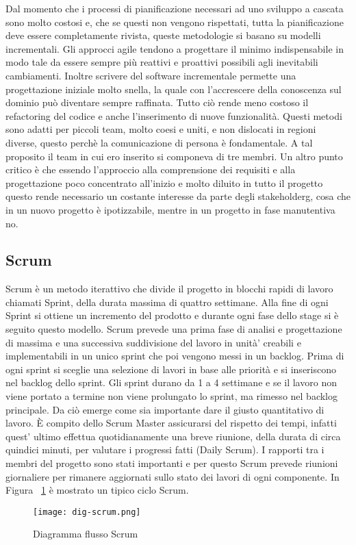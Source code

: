 Dal momento che i processi di pianificazione necessari ad uno sviluppo a cascata sono molto costosi e, che se questi non vengono rispettati, tutta la pianificazione deve essere completamente rivista, queste metodologie si basano su modelli incrementali. Gli approcci agile tendono a progettare il minimo indispensabile in modo tale da essere sempre più reattivi e proattivi possibili agli inevitabili cambiamenti. Inoltre scrivere del software incrementale permette una progettazione iniziale molto snella, la quale con l’accrescere della conoscenza sul dominio può diventare sempre raffinata. Tutto ciò rende meno costoso il refactoring del codice e anche l’inserimento di nuove funzionalità. 
Questi metodi sono adatti per piccoli team, molto coesi e uniti, e non dislocati in regioni diverse, questo perchè la comunicazione di persona è fondamentale. A tal proposito il team in cui ero inserito si componeva di tre membri.
Un altro punto critico è che essendo l’approccio alla comprensione dei requisiti e alla progettazione poco concentrato all’inizio e molto diluito in tutto il progetto questo rende necessario un costante interesse da parte degli \gls{stakeholderg}, cosa che in un nuovo progetto è ipotizzabile, mentre in un progetto in fase manutentiva no.
\subsection{Scrum}
Scrum è un metodo iterattivo che divide il progetto in blocchi rapidi di lavoro chiamati
Sprint, della durata massima di quattro settimane. Alla fine di ogni Sprint si ottiene
un incremento del prodotto e durante ogni fase dello stage si è seguito questo modello. 
Scrum prevede una prima fase di analisi e progettazione di massima e una successiva suddivisione del lavoro in unità’ creabili e implementabili in un unico sprint che poi vengono messi in un backlog. Prima di ogni sprint si sceglie una selezione di lavori in base alle priorità e si inseriscono nel backlog dello sprint. Gli sprint durano da 1 a 4 settimane e se il lavoro non viene portato a termine non viene prolungato lo sprint, ma rimesso nel backlog principale. Da ciò emerge come sia importante dare il giusto quantitativo di lavoro. È compito dello
Scrum Master assicurarsi del rispetto dei tempi, infatti quest' ultimo effettua quotidianamente una breve
riunione, della durata di circa quindici minuti, per valutare i progressi fatti (Daily
Scrum). I rapporti tra i membri del progetto sono stati importanti e per questo Scrum prevede riunioni giornaliere per rimanere aggiornati sullo stato dei lavori di ogni componente.
In Figura ~\ref{fig:scrum} è mostrato un tipico ciclo Scrum.
\begin{figure}[!h]   
    \centering
    \texttt{[image: dig-scrum.png]} 
    \caption{Diagramma flusso Scrum}
    \label{fig:scrum} 
\end{figure}